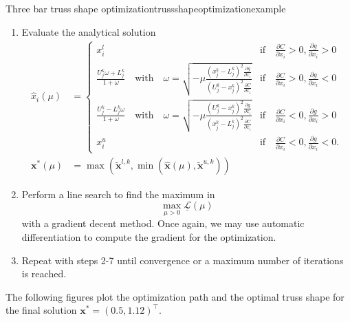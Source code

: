 \begin{example}{Three bar truss shape optimization}{trussshapeoptimizationexample}
\begin{enumerate}
        \item Evaluate the analytical solution
            \begin{align}
                \hat{x}_i(\mu) &= 
                \begin{cases}
                    x^l_i 
                        &\textrm{if} \quad \frac{\partial C}{\partial x_i} > 0, \frac{\partial g}{\partial x_i} > 0 \\
                    \frac{U_j^k\omega + L_j^k}{1+\omega} \quad \text{with} \quad \omega = \sqrt{-\mu\frac{(x_j^k-L_j^k)^2\frac{\partial g}{\partial x_i}}{(U_j^k-x_j^k)^2\frac{\partial C}{\partial x_i}}}
                        &\textrm{if} \quad \frac{\partial C}{\partial x_i}  > 0, \frac{\partial g}{\partial x_i} <0\\
                    \frac{U_j^k-L_j^k\omega}{1+\omega} \quad \text{with} \quad \omega = \sqrt{-\mu\frac{(U_j^k-x_j^k)^2\frac{\partial g}{\partial x_i}}{(x_j^k-L_j^k)^2\frac{\partial C}{\partial x_i}}} 
                        &\textrm{if} \quad \frac{\partial C}{\partial x_i} < 0, \frac{\partial g}{\partial x_i}  > 0\\
                    x^u_i 
                        &\textrm{if} \quad \frac{\partial C}{\partial x_i}< 0, \frac{\partial g}{\partial x_i} < 0.
                \end{cases} \\
                \mathbf{x}^* (\mu) &= \max\left(\tilde{\mathbf{x}}^{l,k}, \min \left(\hat{\mathbf{x}}(\mu), \tilde{\mathbf{x}}^{u,k} \right)\right)
            \end{align}
        \item Perform a line search to find the maximum in 
            \begin{equation}
                \max_{\mu>0} \underline{\mathcal{L}}(\mu)
            \end{equation}
            with a gradient decent method. Once again, we may use automatic differentiation to compute the gradient for the optimization.
        \item Repeat with steps 2-7 until convergence or a maximum number of iterations is reached.
    \end{enumerate}
    
    The following figures plot the optimization path and the optimal truss shape for the final solution $\mathbf{x}^* = (0.5, 1.12)^\top$.


\end{example}
